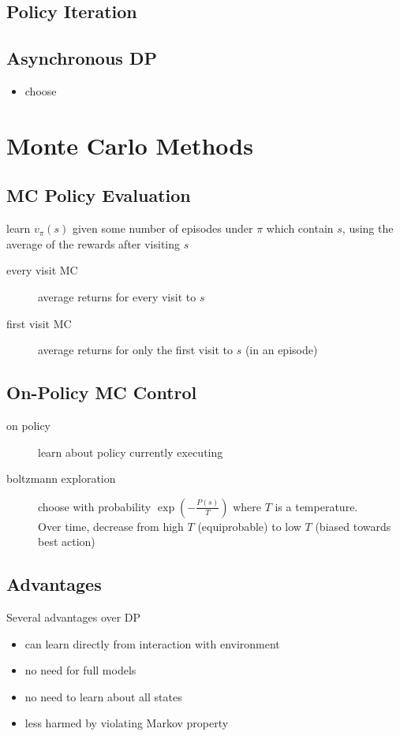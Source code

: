 \documentclass[]{article}
\theoremstyle{definition}
\begin{document}
\subsection{Policy Iteration}
\label{sec:policy_iteration}

\subsection{Asynchronous DP}
\label{sub:asynchronous_dp}

\begin{itemize}
    \item choose
\end{itemize}

\section{Monte Carlo Methods}
\label{sec:monte_carlo_methods}

\subsection{MC Policy Evaluation}
\label{sub:mc_policy_evaluation}

learn $v_\pi(s)$ given some number of episodes under $\pi$ which contain $s$, using the average of the rewards after visiting $s$
\begin{description}
    \item[every visit MC] average returns for every visit to $s$
    \item[first visit MC] average returns for only the first visit to $s$ (in an episode)
\end{description}

\subsection{On-Policy MC Control}
\label{sub:on_policy_mc_control}

\begin{description}
    \item[on policy] learn about policy currently executing
    \item[boltzmann exploration] choose with probability $\exp (- \frac{P(s)}{T} )$ where $T$ is a temperature.  \\
        Over time, decrease from high $T$ (equiprobable) to low $T$ (biased towards best action)
\end{description}

\subsection{Advantages}
\label{sub:advantages}
Several advantages over DP
\begin{itemize}
    \item can learn directly from interaction with environment
    \item no need for full models
    \item no need to learn about all states
    \item less harmed by violating Markov property
\end{itemize}
\end{document}
